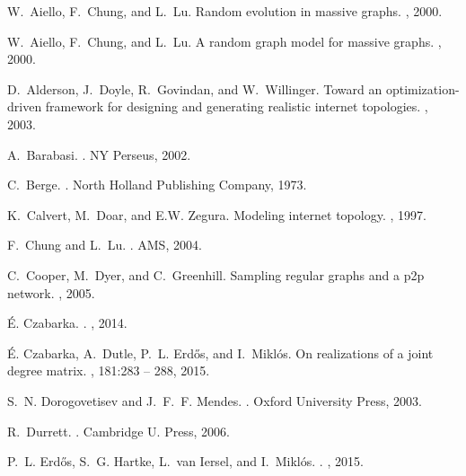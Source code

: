 \documentclass[12pt,a4paper]{article}
\theoremstyle{definition}
\theoremstyle{plain}
\begin{document}



\begin{thebibliography}{10}

W.~Aiello, F.~Chung, and L.~Lu.
\newblock Random evolution in massive graphs.
, 2000.

W.~Aiello, F.~Chung, and L.~Lu.
\newblock A random graph model for massive graphs.
, 2000.

D.~Alderson, J.~Doyle, R.~Govindan, and W.~Willinger.
\newblock Toward an optimization-driven framework for designing and generating
  realistic internet topologies.
, 2003.

A.~Barabasi.
.
\newblock NY Perseus, 2002.

C.~Berge.
.
\newblock North Holland Publishing Company, 1973.

K.~Calvert, M.~Doar, and E.W. Zegura.
\newblock Modeling internet topology.
, 1997.

F.~Chung and L.~Lu.
.
\newblock AMS, 2004.

C.~Cooper, M.~Dyer, and C.~Greenhill.
\newblock Sampling regular graphs and a p2p network.
, 2005.

\'{E}. Czabarka.
.
, 2014.

\'{E}. Czabarka, A.~Dutle, P.~L. Erd\H{o}s, and I.~Mikl\'{o}s.
\newblock On realizations of a joint degree matrix.
, 181:283 -- 288, 2015.

S.~N. Dorogovetisev and J.~F.~F. Mendes.
.
\newblock Oxford University Press, 2003.

R.~Durrett.
.
\newblock Cambridge U. Press, 2006.

P.~L. {Erd{\H o}s}, S.~G. {Hartke}, L.~{van Iersel}, and I.~{Mikl{\'o}s}.
.
, 2015.


\end{thebibliography}
\end{document}
